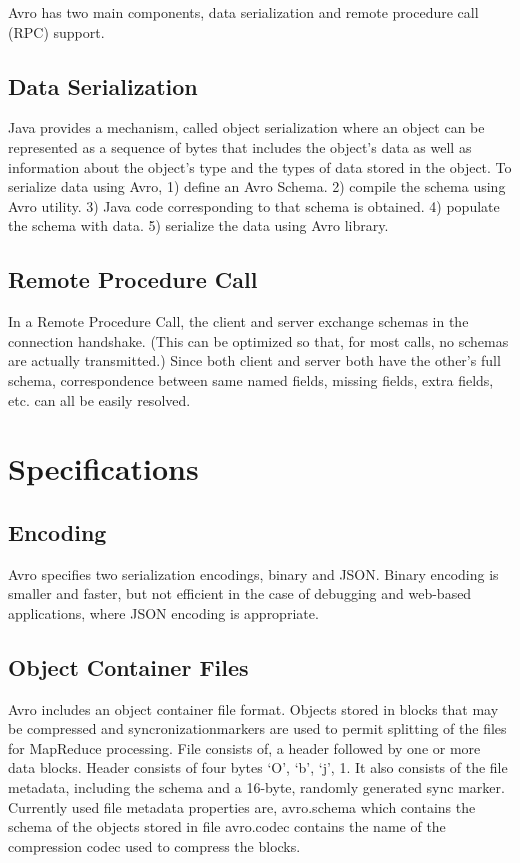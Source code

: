 \documentclass[9pt,twocolumn,twoside]{../../styles/osajnl}
\begin{document}
Avro has two main components, data serialization and remote procedure
call (RPC) support.\cite{www-using-avro}

\subsection{Data Serialization}

Java provides a mechanism, called object serialization where an object
can be represented as a sequence of bytes that includes the object's
data as well as information about the object's type and the types of
data stored in the object. To serialize data using Avro,
1) define an Avro Schema.
2) compile the schema using Avro utility.
3) Java code corresponding to that schema is obtained.
4) populate the schema with data.
5) serialize the data using Avro library\cite{www-avro-serialzation}.

\subsection{Remote Procedure Call}

In a Remote Procedure Call, the client and server exchange schemas in
the connection handshake. (This can be optimized so that, for most
calls, no schemas are actually transmitted.) Since both client and
server both have the other's full schema, correspondence between same
named fields, missing fields, extra fields, etc. can all be easily
resolved\cite{www-avro-rpc}.

\section{Specifications}
\subsection{Encoding}

Avro specifies two serialization encodings, binary and JSON. Binary
encoding is smaller and faster, but not efficient in the case of
debugging and web-based applications, where JSON encoding is
appropriate\cite{www-avro-encoding}.

\subsection{Object Container Files}

Avro includes an object container file format. Objects stored in
blocks that may be compressed and syncronization\SE markers are used to
permit splitting of the files for MapReduce processing.  File consists
of, a header followed by one or more data blocks.  Header consists of
four bytes ‘O’, ‘b’, ‘j’, 1. It also consists of the file metadata,
including the schema and a 16-byte, randomly generated sync
marker\cite{www-wiki-avro}. Currently used file metadata properties
are, avro.schema which contains the schema of the objects stored in
file avro.codec contains the name of the compression codec used to
compress the blocks.
\end{document}
